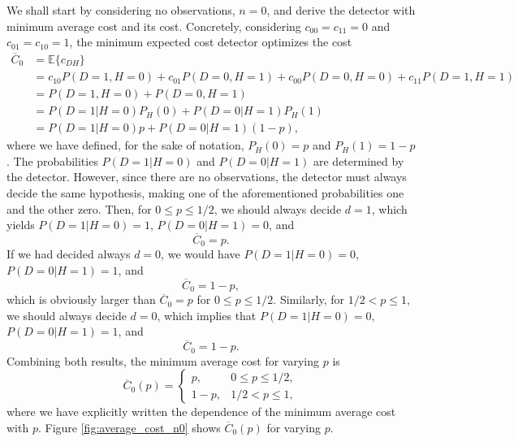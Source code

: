 We shall start by considering no observations, $n = 0$, and derive the detector with minimum average cost and its cost. Concretely, considering $c_{00} = c_{11} = 0$ and $c_{01} = c_{10} = 1$, the minimum expected cost detector optimizes the cost
\begin{align*}
	\overline{C}_0 &= \mathbb{E}\{c_{DH}\} \\ &= c_{10} P(D = 1, H = 0) +  c_{01} P(D = 0, H = 1)  + c_{00} P(D = 0, H = 0) +  c_{11} P(D = 1, H = 1)  \\
	&= P(D = 1, H = 0) +  P(D = 0, H = 1) \\ &= P(D = 1 | H = 0) P_H(0) +  P(D = 0 |H = 1) P_H(1)
	\\ &= P(D = 1 | H = 0) p +  P(D = 0 |H = 1) (1 - p),
\end{align*}
where we have defined, for the sake of notation, $P_H(0) = p$ and $P_H(1) = 1 - p$. The probabilities $P(D = 1 | H = 0)$ and $P(D = 0 | H = 1)$ are determined by the detector. However, since there are no observations, the detector must always decide the same hypothesis, making one of the aforementioned probabilities one and the other zero. Then, for $0 \leq p \leq 1/2$, we should always decide $d = 1$, which yields $P(D = 1 | H = 0) = 1$, $P(D = 0 | H = 1) = 0$, and
\begin{equation*}
	\overline{C}_0 = p.
\end{equation*}
If we had decided always $d = 0$, we would have $P(D = 1 | H = 0) = 0$, $P(D = 0 | H = 1) = 1$, and
\begin{equation*}
	\overline{C}_0 = 1 - p,
\end{equation*}
which is obviously larger than $\overline{C}_0 = p$ for $0 \leq p \leq 1/2$. Similarly, for $1/2 < p \leq 1$, we should always decide $d = 0$, which implies that $P(D = 1 | H = 0) = 0$, $P(D = 0 | H = 1) = 1$, and
\begin{equation*}
	\overline{C}_0 = 1 - p.
\end{equation*}
Combining both results, the minimum average cost for varying $p$ is
\begin{equation*}
	\overline{C}_0(p) = \begin{cases} p, & 0 \leq p \leq 1/2, \\ 1 - p, & 1/2 < p \leq 1, \end{cases}
\end{equation*}
where we have explicitly written the dependence of the minimum average cost  with $p$. Figure \ref{fig:average_cost_n0} shows $\overline{C}_0(p)$ for varying $p$.

